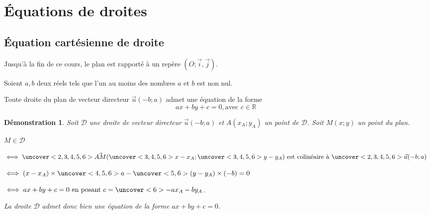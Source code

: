 \documentclass{beamer}
\newtheorem{demonstration}[theorem]{Démonstration}
\begin{document}
   \section{\'Equations de droites}
   
   
   
   \subsection{\'Equation cartésienne de droite}
   
    \begin{frame}
    
     Jusqu'à la fin de ce cours, le plan est rapporté à un repère $(O;\vec{i},\vec{j})$.
   
     \begin{theorem}
     
    

    Soient $a,b$ deux réels tels que l'un au moins des nombres $a$ et $b$ est non nul.
    
    Toute droite du plan de vecteur directeur $\vec{u}(-b;a)$ admet une équation de la forme 
    $$ax+by+c=0, \textrm{avec $c \in \mathbb{R}$}$$
   
   \end{theorem}

  \end{frame}
  
  \begin{frame}
  \begin{demonstration}
    
    Soit $\mathcal{D}$ une droite de vecteur directeur $\vec{u}(-b;a)$ et $A(x_A;y_A)$ un point de 
    $\mathcal{D}$. Soit $M(x;y)$ un point du plan.
    
    $M \in \mathcal{D}$
    
    $\iff \uncover<2,3,4,5,6>{\vec{AM}}(\uncover<3,4,5,6>{x-x_A};\uncover<3,4,5,6>{y-y_A}) 
    \textrm{ est colinéaire à } \uncover<2,3,4,5,6>{\vec{u}(-b;a)}$
    
    $\iff (x-x_A)\times \uncover<4,5,6>{a} -\uncover<5,6>{(y-y_A)} \times (-b)=0$ 
    
    $\iff ax+by+c=0 \textrm{ en posant }c=\uncover<6>{-ax_A-by_A}$.
    
    La droite $\mathcal{D}$ admet donc bien une équation de la forme $ax+by+c=0$.
   \end{demonstration}
   
   \end{frame}
   
\end{document}
